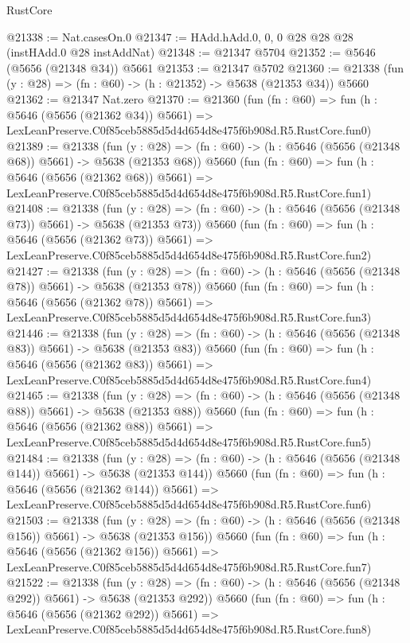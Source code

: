 \begin{lexlean}{RustCore}
\begin{coremodule}
@21338 := Nat.casesOn.{0}
@21347 := HAdd.hAdd.{0, 0, 0} @28 @28 @28 (instHAdd.{0} @28 instAddNat)
@21348 := @21347 @5704
@21352 := @5646 (@5656 (@21348 @34)) @5661
@21353 := @21347 @5702
@21360 := @21338 (fun (y : @28) => (fn : @60) -> (h : @21352) -> @5638 (@21353 @34)) @5660
@21362 := @21347 Nat.zero
@21370 := @21360
    (fun (fn : @60) =>
    fun (h : @5646 (@5656 (@21362 @34)) @5661) =>
    LexLeanPreserve.C0f85ceb5885d5d4d654d8e475f6b908d.R5.RustCore.fun0)
@21389 := @21338
    (fun (y : @28) => (fn : @60) -> (h : @5646 (@5656 (@21348 @68)) @5661) -> @5638 (@21353 @68))
    @5660
    (fun (fn : @60) =>
    fun (h : @5646 (@5656 (@21362 @68)) @5661) =>
    LexLeanPreserve.C0f85ceb5885d5d4d654d8e475f6b908d.R5.RustCore.fun1)
@21408 := @21338
    (fun (y : @28) => (fn : @60) -> (h : @5646 (@5656 (@21348 @73)) @5661) -> @5638 (@21353 @73))
    @5660
    (fun (fn : @60) =>
    fun (h : @5646 (@5656 (@21362 @73)) @5661) =>
    LexLeanPreserve.C0f85ceb5885d5d4d654d8e475f6b908d.R5.RustCore.fun2)
@21427 := @21338
    (fun (y : @28) => (fn : @60) -> (h : @5646 (@5656 (@21348 @78)) @5661) -> @5638 (@21353 @78))
    @5660
    (fun (fn : @60) =>
    fun (h : @5646 (@5656 (@21362 @78)) @5661) =>
    LexLeanPreserve.C0f85ceb5885d5d4d654d8e475f6b908d.R5.RustCore.fun3)
@21446 := @21338
    (fun (y : @28) => (fn : @60) -> (h : @5646 (@5656 (@21348 @83)) @5661) -> @5638 (@21353 @83))
    @5660
    (fun (fn : @60) =>
    fun (h : @5646 (@5656 (@21362 @83)) @5661) =>
    LexLeanPreserve.C0f85ceb5885d5d4d654d8e475f6b908d.R5.RustCore.fun4)
@21465 := @21338
    (fun (y : @28) => (fn : @60) -> (h : @5646 (@5656 (@21348 @88)) @5661) -> @5638 (@21353 @88))
    @5660
    (fun (fn : @60) =>
    fun (h : @5646 (@5656 (@21362 @88)) @5661) =>
    LexLeanPreserve.C0f85ceb5885d5d4d654d8e475f6b908d.R5.RustCore.fun5)
@21484 := @21338
    (fun (y : @28) => (fn : @60) -> (h : @5646 (@5656 (@21348 @144)) @5661) -> @5638 (@21353 @144))
    @5660
    (fun (fn : @60) =>
    fun (h : @5646 (@5656 (@21362 @144)) @5661) =>
    LexLeanPreserve.C0f85ceb5885d5d4d654d8e475f6b908d.R5.RustCore.fun6)
@21503 := @21338
    (fun (y : @28) => (fn : @60) -> (h : @5646 (@5656 (@21348 @156)) @5661) -> @5638 (@21353 @156))
    @5660
    (fun (fn : @60) =>
    fun (h : @5646 (@5656 (@21362 @156)) @5661) =>
    LexLeanPreserve.C0f85ceb5885d5d4d654d8e475f6b908d.R5.RustCore.fun7)
@21522 := @21338
    (fun (y : @28) => (fn : @60) -> (h : @5646 (@5656 (@21348 @292)) @5661) -> @5638 (@21353 @292))
    @5660
    (fun (fn : @60) =>
    fun (h : @5646 (@5656 (@21362 @292)) @5661) =>
    LexLeanPreserve.C0f85ceb5885d5d4d654d8e475f6b908d.R5.RustCore.fun8)

\end{coremodule}
\end{lexlean}
